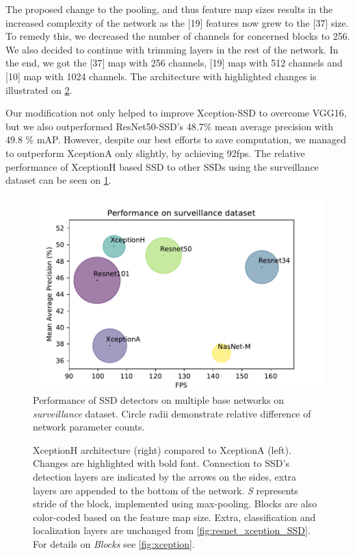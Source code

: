 The proposed change to the pooling, and thus feature map sizes results in the increased complexity of the network as the [19] features now grew to the [37] size. To remedy this, we decreased the number of channels for concerned blocks to 256. We also decided to continue with trimming layers in the rest of the network. In the end, we got the [37] map with 256 channels, [19] map with 512 channels and [10] map with 1024 channels. The architecture with highlighted changes is illustrated on \cref{fig:xceptionH_SSD}. 

Our modification not only helped to improve Xception-SSD to overcome VGG16, but we also outperformed ResNet50-SSD's 48.7\% mean average precision with 49.8 \% mAP. However, despite our best efforts to save computation, we managed to outperform XceptionA only slightly, by achieving 92fps.  The relative performance of XceptionH based SSD to other SSDs using the surveillance dataset can be seen on \cref{fig:surv_perf}.

\begin{figure}
    \centering
    \includegraphics[width=\textwidth]{img/fps_map_s}
    \caption[Performance of SSD with multiple base networks on Surveillance dataset]{Performance of SSD detectors on multiple base networks on \textit{surveillance} dataset. Circle radii demonstrate relative difference of network parameter counts.} 
    \label{fig:surv_perf}
\end{figure}

\begin{figure}
    \centering
    \xceptionSSD
    \caption[XceptionH-SSD]%
    {XceptionH architecture (right) compared to XceptionA (left). Changes are highlighted with bold font. Connection to SSD's detection layers are indicated by the arrows on the sides, extra layers are appended to the bottom of the network.  \textit{S} represents stride of the block, implemented using max-pooling. Blocks are also color-coded based on the feature map size. Extra, classification and localization layers are unchanged from \cref{fig:resnet_xception_SSD}. For details on \textit{Blocks} see \cref{fig:xception}.} 
    \label{fig:xceptionH_SSD}
\end{figure}


